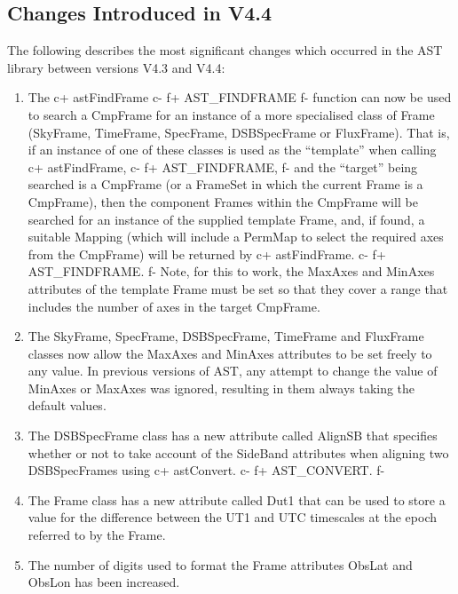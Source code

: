 \documentclass[twoside,11pt]{article}
\begin{document}
\subsection{Changes Introduced in V4.4}

The following describes the most significant changes which occurred in
the AST library between versions V4.3 and V4.4:

\begin{enumerate}

\item The
c+
astFindFrame
c-
f+
AST\_FINDFRAME
f-
function can now be used to search a CmpFrame for an instance of a more
specialised class of Frame (SkyFrame, TimeFrame, SpecFrame, DSBSpecFrame
or FluxFrame). That is, if an instance of one of these classes is used as
the ``template'' when calling
c+
astFindFrame,
c-
f+
AST\_FINDFRAME,
f-
and the ``target'' being searched is a CmpFrame (or a FrameSet in which the
current Frame is a CmpFrame), then the component Frames within the CmpFrame
will be searched for an instance of the supplied template Frame, and, if
found, a suitable Mapping (which will include a PermMap to select the
required axes from the CmpFrame) will be returned by
c+
astFindFrame.
c-
f+
AST\_FINDFRAME.
f-
Note, for this to work, the MaxAxes and MinAxes attributes of the template
Frame must be set so that they cover a range that includes the number of axes
in the target CmpFrame.

\item The SkyFrame, SpecFrame, DSBSpecFrame, TimeFrame and FluxFrame classes
now allow the MaxAxes and MinAxes attributes to be set freely to any value.
In previous versions of AST, any attempt to change the value of MinAxes
or MaxAxes was ignored, resulting in them always taking the default values.

\item The DSBSpecFrame class has a new attribute called AlignSB that
specifies whether or not to take account of the SideBand attributes when
aligning two DSBSpecFrames using
c+
astConvert.
c-
f+
AST\_CONVERT.
f-

\item The Frame class has a new attribute called Dut1 that can be used to
store a value for the difference between the UT1 and UTC timescales at
the epoch referred to by the Frame.

\item The number of digits used to format the Frame attributes ObsLat and
ObsLon has been increased.


\end{enumerate}
\end{document}
